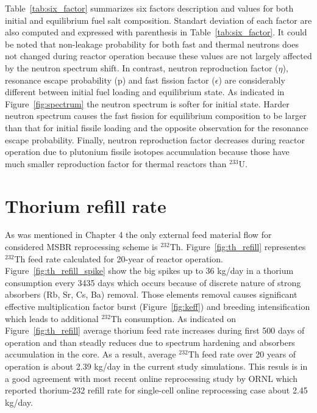 Table~\ref{tab:six_factor} summarizes six factors description and values for both initial and equilibrium fuel salt composition. Standart deviation of each factor are also computed and expressed with parenthesis in Table~\ref{tab:six_factor}. It could be noted that non-leakage probability for both fast and thermal neutrons does not changed during reactor operation because these values are not largely affected by the neutron spectrum shift. In contrast, neutron reproduction factor ($\eta$), resonance escape probability (p) and fast fission factor ($\epsilon$) are considerably different between initial fuel loading and equilibrium state. As indicated in Figure~\ref{fig:spectrum} the neutron spectrum is softer for initial state. Harder neutron spectrum causes the fast fission for equilibrium composition to be larger than that for initial fissile loading and the opposite observation for the resonance escape probability. Finally, neutron reproduction factor decreases during reactor operation due to plutonium fissile isotopes accumulation because those have much smaller reproduction factor for thermal reactors than $^{233}$U.

\section{Thorium refill rate}
As was mentioned in Chapter 4 the only external feed material flow for considered \gls{MSBR} reprocessing scheme is $^{232}$Th. Figure~\ref{fig:th_refill} representes $^{232}$Th feed rate calculated for 20-year of reactor operation. Figure~\ref{fig:th_refill_spike} show the big spikes up to 36 kg/day in a thorium consumption every 3435 days which occurs because of discrete nature of strong absorbers (Rb, Sr, Cs, Ba) removal. Those elements removal causes significant effective multiplication factor burst (Figure~\ref{fig:keff}) and breeding intensification which leads to additional $^{232}$Th consumption. As indicated on Figure~\ref{fig:th_refill} average thorium feed rate increases during first 500 days of operation and than steadly reduces due to spectrum hardening and absorbers accumulation in the core. As a result, average $^{232}$Th feed rate over 20 years of operation is about 2.39 kg/day in the current study simulations. This resuls is in a good agreement with most recent online reprocessing study by \gls{ORNL} \cite{betzler_molten_2017} which reported thorium-232 refill rate for single-cell online reprocessing case about 2.45 kg/day.

